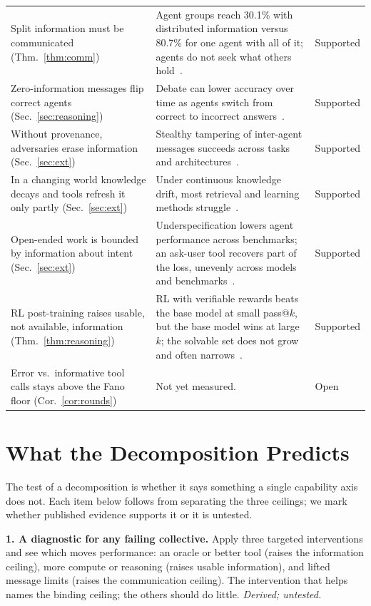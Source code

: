 \documentclass[conference]{IEEEtran}
\theoremstyle{definition}
\begin{document}
\begin{table}[t]
\begin{tabular}{@{}p{4.4cm}p{9.6cm}p{2.0cm}@{}}
Split information must be communicated (Thm.~\ref{thm:comm})
 & Agent groups reach 30.1\% with distributed information versus 80.7\% for one agent with all of it; agents do not seek what others hold~\cite{li2026hidden}. & Supported \\
Zero-information messages flip correct agents (Sec.~\ref{sec:reasoning})
 & Debate can lower accuracy over time as agents switch from correct to incorrect answers~\cite{wynn2025}. & Supported \\
Without provenance, adversaries erase information (Sec.~\ref{sec:ext})
 & Stealthy tampering of inter-agent messages succeeds across tasks and architectures~\cite{yan2026mast}. & Supported \\
In a changing world knowledge decays and tools refresh it only partly (Sec.~\ref{sec:ext})
 & Under continuous knowledge drift, most retrieval and learning methods struggle~\cite{liu2026drift}. & Supported \\
Open-ended work is bounded by information about intent (Sec.~\ref{sec:ext})
 & Underspecification lowers agent performance across benchmarks; an ask-user tool recovers part of the loss, unevenly across models and benchmarks~\cite{pu2026lhaw}. & Supported \\
RL post-training raises usable, not available, information (Thm.~\ref{thm:reasoning})
 & RL with verifiable rewards beats the base model at small pass@$k$, but the base model wins at large $k$; the solvable set does not grow and often narrows~\cite{yue2025}. & Supported \\
Error vs.\ informative tool calls stays above the Fano floor (Cor.~\ref{cor:rounds})
 & Not yet measured. & Open \\
\bottomrule
\end{tabular}
\end{table}

\section{What the Decomposition Predicts}\label{sec:predict}

The test of a decomposition is whether it says something a single capability
axis does not. Each item below follows from separating the three ceilings; we
mark whether published evidence supports it or it is untested.

\noindent\textbf{1. A diagnostic for any failing collective.} Apply three
targeted interventions and see which moves performance: an oracle or better tool
(raises the information ceiling), more compute or reasoning (raises usable
information), and lifted message limits (raises the communication ceiling). The
intervention that helps names the binding ceiling; the others should do little.
\emph{Derived; untested.}
\end{document}
